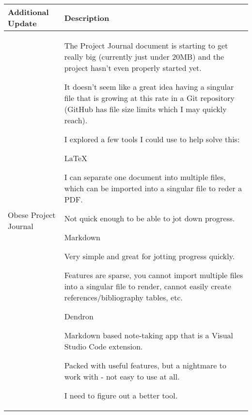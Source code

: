 \begin{table}[!h]
    \centering
    \begin{tabularx}{\textwidth}{|l|X|}
        \hline
        Additional Update & Description \\
        \hline
        \hline
        Obese Project Journal & 
        \begin{myitemize}
            \item The Project Journal document is starting to get really big (currently just under 20MB) and the project hasn't even properly started yet.
            \item It doesn't seem like a great idea having a singular file that is growing at this rate in a Git repository (GitHub has file size limits which I may quickly reach).
            \item I explored a few tools I could use to help solve this:
            \item \LaTeX
            \begin{myitemize}
                \item I can separate one document into multiple files, which can be imported into a singular file to reder a PDF.
                \item Not quick enough to be able to jot down progress.
            \end{myitemize}
            \item Markdown
            \begin{myitemize}
                \item Very simple and great for jotting progress quickly.
                \item Features are sparse, you cannot import multiple files into a singular file to render, cannot easily create references/bibliography tables, etc.
            \end{myitemize}
            \item Dendron
            \begin{myitemize}
                \item Markdown based note-taking app that is a Visual Studio Code extension.
                \item Packed with useful features, but a nightmare to work with - not easy to use at all.
            \end{myitemize}
            \item I need to figure out a better tool.
        \end{myitemize} \\
        \hline
    \end{tabularx}
\end{table}
